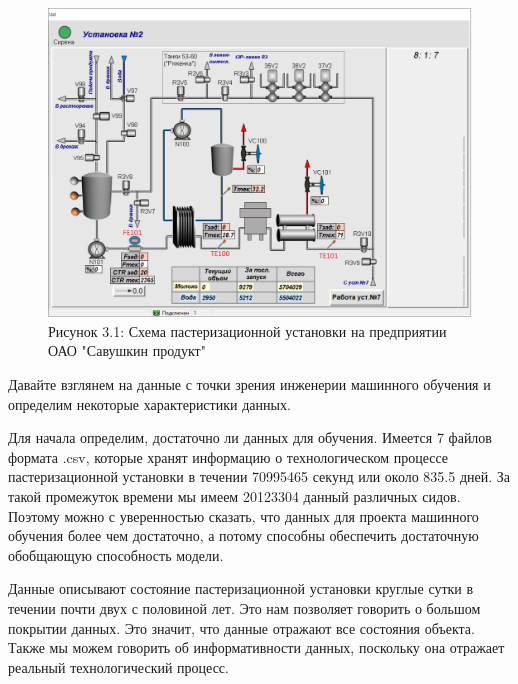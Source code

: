 {  \begin{figure}
    \centering
    \def\svgwidth{\textwidth}
    \includegraphics[width=\textwidth]{images/paster.png}
    \caption*{\gostFont Рисунок 3.1: Схема пастеризационной установки на предприятии ОАО "Савушкин продукт"}
    \label{fig:NNBlackBox}
  \end{figure}

  \par \redline Давайте взглянем на данные с точки зрения инженерии машинного обучения и определим некоторые характеристики данных. 

  \par \redline Для начала определим, достаточно ли данных для обучения. Имеется 7 файлов формата .csv, которые хранят информацию о технологическом процессе пастеризационной установки в течении 70995465 секунд или около 835.5 дней. За такой промежуток времени мы имеем 20123304 данный различных сидов. Поэтому можно с уверенностью сказать, что данных для проекта машинного обучения более чем достаточно, а потому способны обеспечить достаточную обобщающую способность модели.

  \par \redline Данные описывают состояние пастеризационной установки круглые сутки в течении почти двух с половиной лет. Это нам позволяет говорить о большом покрытии данных. Это значит, что данные отражают все состояния объекта. Также мы можем говорить об информативности данных, поскольку она отражает реальный технологический процесс.

}
